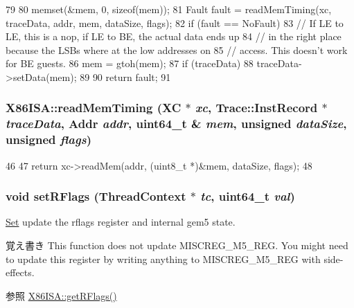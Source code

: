 \begin{DoxyCode}
79 {
80     memset(&mem, 0, sizeof(mem));
81     Fault fault = readMemTiming(xc, traceData, addr, mem, dataSize, flags);
82     if (fault == NoFault) {
83         // If LE to LE, this is a nop, if LE to BE, the actual data ends up
84         // in the right place because the LSBs where at the low addresses on
85         // access. This doesn't work for BE guests.
86         mem = gtoh(mem);
87         if (traceData)
88             traceData->setData(mem);
89     }
90     return fault;
91 }
\end{DoxyCode}
\hypertarget{namespaceX86ISA_a6541d95ba049bea304004bc765578697}{
\subsubsection[{readMemTiming}]{ X86ISA::readMemTiming (XC $\ast$ {\em xc}, \/  {\bf Trace::InstRecord} $\ast$ {\em traceData}, \/  {\bf Addr} {\em addr}, \/  uint64\_\-t \& {\em mem}, \/  unsigned {\em dataSize}, \/  unsigned {\em flags})}}
\label{namespaceX86ISA_a6541d95ba049bea304004bc765578697}



\begin{DoxyCode}
46 {
47     return xc->readMem(addr, (uint8_t *)&mem, dataSize, flags);
48 }
\end{DoxyCode}
\hypertarget{namespaceX86ISA_afcfb8527ec900004ecda24cd03b0b2a9}{
\subsubsection[{setRFlags}]{\setlength{\rightskip}{0pt plus 5cm}void setRFlags ({\bf ThreadContext} $\ast$ {\em tc}, \/  uint64\_\-t {\em val})}}
\label{namespaceX86ISA_afcfb8527ec900004ecda24cd03b0b2a9}
\hyperlink{classSet}{Set} update the rflags register and internal gem5 state.

\begin{DoxyNote}{覚え書き}
This function does not update MISCREG\_\-M5\_\-REG. You might need to update this register by writing anything to MISCREG\_\-M5\_\-REG with side-\/effects.
\end{DoxyNote}
\begin{DoxySeeAlso}{参照}
\hyperlink{namespaceX86ISA_ab5e0d51a18a3bce3397edd01a4b51492}{X86ISA::getRFlags()}
\end{DoxySeeAlso}

